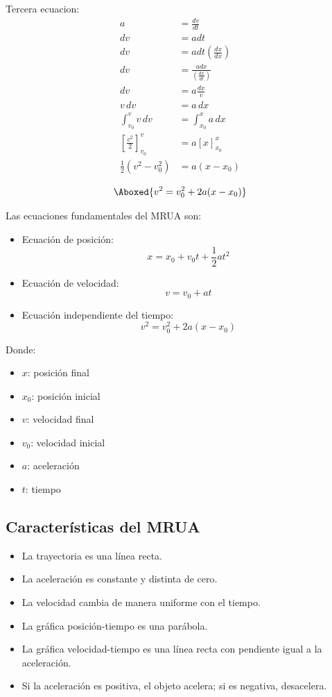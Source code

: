 Tercera ecuacion:
\begin{align*}
a &= \frac{dv}{dt}\\
dv &= a dt\\
dv &= a dt(\frac{dx}{dx})\\
dv &= \frac{a dx}{(\frac{dx}{dt})}\\
dv &= a\frac{dx}{v}\\
v\,dv &= a\,dx\\
\int_{v_0}^{v} v\,dv &= \int_{x_0}^{x} a\,dx\\
\left[\frac{v^2}{2}\right]_{v_0}^{v} &= a\left[x\right]_{x_0}^{x}\\
\frac{1}{2}(v^2 - v_0^2) &= a(x - x_0)
\end{align*}

\vspace{-30pt}

\begin{align*}
    \Aboxed{v^2 = v_0^2 + 2a(x - x_0)}
\end{align*}

Las ecuaciones fundamentales del MRUA son:

\begin{itemize}
    \item Ecuación de posición:
    \[
    x = x_0 + v_0 t + \frac{1}{2}at^2
    \]

    \item Ecuación de velocidad:
    \[
    v = v_0 + at
    \]

    \item Ecuación independiente del tiempo:
    \[
    v^2 = v_0^2 + 2a(x - x_0)
    \]
\end{itemize}

Donde:
\begin{itemize}
    \setlength{\itemsep}{0pt}
    \item $x$: posición final
    \item $x_0$: posición inicial
    \item $v$: velocidad final
    \item $v_0$: velocidad inicial
    \item $a$: aceleración
    \item $t$: tiempo
\end{itemize}

\subsection{Características del MRUA}

\begin{itemize}
    \setlength{\itemsep}{0pt}
    \item La trayectoria es una línea recta.
    \item La aceleración es constante y distinta de cero.
    \item La velocidad cambia de manera uniforme con el tiempo.
    \item La gráfica posición-tiempo es una parábola.
    \item La gráfica velocidad-tiempo es una línea recta con pendiente igual a la aceleración.
    \item Si la aceleración es positiva, el objeto acelera; si es negativa, desacelera.
\end{itemize}
